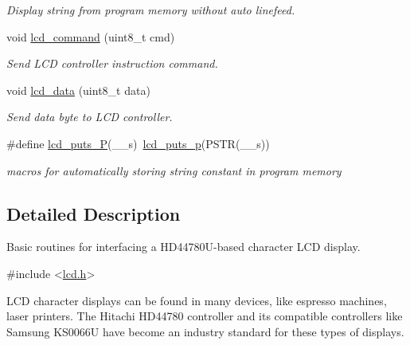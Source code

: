 \begin{DoxyCompactItemize}
\begin{DoxyCompactList}\small\item\em Display string from program memory without auto linefeed. \end{DoxyCompactList}\item 
void \hyperlink{group__pfleury__lcd_gaea9d14f02df06f948cb5a56776980826}{lcd\+\_\+command} (uint8\+\_\+t cmd)
\begin{DoxyCompactList}\small\item\em Send L\+CD controller instruction command. \end{DoxyCompactList}\item 
void \hyperlink{group__pfleury__lcd_gad0729d2cba627825a089ca1fff12ba29}{lcd\+\_\+data} (uint8\+\_\+t data)
\begin{DoxyCompactList}\small\item\em Send data byte to L\+CD controller. \end{DoxyCompactList}\item 
\#define \hyperlink{group__pfleury__lcd_ga4f1928f1515e21422d5a33af2949f2f7}{lcd\+\_\+puts\+\_\+P}(\+\_\+\+\_\+s)~\hyperlink{group__pfleury__lcd_ga9022a24a56a9b15681f62eb6ba77e5de}{lcd\+\_\+puts\+\_\+p}(P\+S\+TR(\+\_\+\+\_\+s))\hypertarget{group__pfleury__lcd_ga4f1928f1515e21422d5a33af2949f2f7}{}\label{group__pfleury__lcd_ga4f1928f1515e21422d5a33af2949f2f7}

\begin{DoxyCompactList}\small\item\em macros for automatically storing string constant in program memory \end{DoxyCompactList}\end{DoxyCompactItemize}


\subsection{Detailed Description}
Basic routines for interfacing a H\+D44780\+U-\/based character L\+CD display. 


\begin{DoxyCode}
\textcolor{preprocessor}{#include <\hyperlink{lcd_8h}{lcd.h}>} 
\end{DoxyCode}


L\+CD character displays can be found in many devices, like espresso machines, laser printers. The Hitachi H\+D44780 controller and its compatible controllers like Samsung K\+S0066U have become an industry standard for these types of displays.


